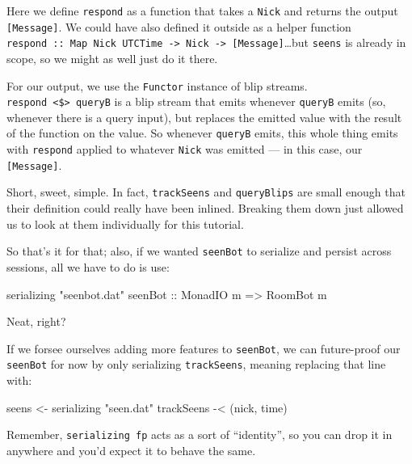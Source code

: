 \documentclass[]{article}
\newenvironment{Shaded}{}{}
\newcommand{\DataTypeTok}[1]{\textcolor[rgb]{0.56,0.13,0.00}{#1}}
\newcommand{\NormalTok}[1]{#1}
\newcommand{\OperatorTok}[1]{\textcolor[rgb]{0.40,0.40,0.40}{#1}}
\newcommand{\OtherTok}[1]{\textcolor[rgb]{0.00,0.44,0.13}{#1}}
\newcommand{\StringTok}[1]{\textcolor[rgb]{0.25,0.44,0.63}{#1}}
\begin{document}
Here we define \texttt{respond} as a function that takes a \texttt{Nick} and
returns the output \texttt{{[}Message{]}}. We could have also defined it outside
as a helper function
\texttt{respond\ ::\ Map\ Nick\ UTCTime\ -\textgreater{}\ Nick\ -\textgreater{}\ {[}Message{]}}\ldots but
\texttt{seens} is already in scope, so we might as well just do it there.

For our output, we use the \texttt{Functor} instance of blip streams.
\texttt{respond\ \textless{}\$\textgreater{}\ queryB} is a blip stream that
emits whenever \texttt{queryB} emits (so, whenever there is a query input), but
replaces the emitted value with the result of the function on the value. So
whenever \texttt{queryB} emits, this whole thing emits with \texttt{respond}
applied to whatever \texttt{Nick} was emitted --- in this case, our
\texttt{{[}Message{]}}.

Short, sweet, simple. In fact, \texttt{trackSeens} and \texttt{queryBlips} are
small enough that their definition could really have been inlined. Breaking them
down just allowed us to look at them individually for this tutorial.

So that's it for that; also, if we wanted \texttt{seenBot} to serialize and
persist across sessions, all we have to do is use:

\begin{Shaded}
\begin{Highlighting}[]
\NormalTok{serializing\textquotesingle{} }\StringTok{"seenbot.dat"}\OtherTok{ seenBot ::} \DataTypeTok{MonadIO}\NormalTok{ m }\OtherTok{=\textgreater{}} \DataTypeTok{RoomBot}\NormalTok{ m}
\end{Highlighting}
\end{Shaded}

Neat, right?

If we forsee ourselves adding more features to \texttt{seenBot}, we can
future-proof our \texttt{seenBot} for now by only serializing
\texttt{trackSeens}, meaning replacing that line with:

\begin{Shaded}
\begin{Highlighting}[]
\NormalTok{    seens }\OtherTok{\textless{}{-}}\NormalTok{ serializing\textquotesingle{} }\StringTok{"seen.dat"}\NormalTok{ trackSeens }\OperatorTok{{-}\textless{}}\NormalTok{ (nick, time)}
\end{Highlighting}
\end{Shaded}

Remember, \texttt{serializing\textquotesingle{}\ fp} acts as a sort of
``identity'', so you can drop it in anywhere and you'd expect it to behave the
same.
\end{document}
